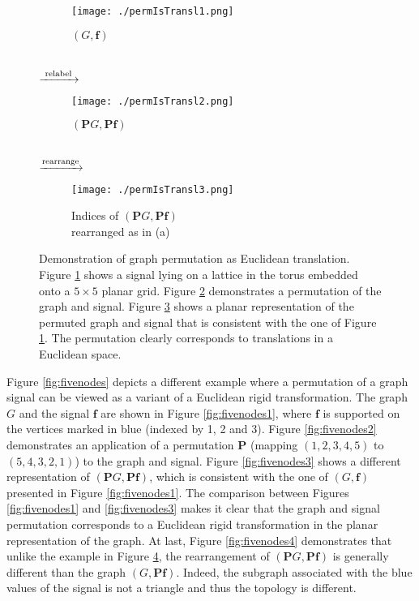 \documentclass{article}
\def\BP{\boldsymbol{P}}
\def\Bf{\boldsymbol{f}}
\begin{document}
\begin{figure}[!ht]
\centering
\begin{subfigure}{.25\textwidth}
	\centering
    \texttt{[image: ./permIsTransl1.png]}
    \caption{$(G, \Bf)$ \\ ~ }
\label{fig:permIsTransl1}
\end{subfigure}
{\large$\xrightarrow{\textup{~relabel~}}$}\begin{subfigure}{.25\textwidth}
	\centering
    \texttt{[image: ./permIsTransl2.png]}
    \caption{$(\BP G, \BP \Bf)$ \\ ~ }
\label{fig:permIsTransl2}
\end{subfigure}
{\large$\xrightarrow{\textup{rearrange}}$}\begin{subfigure}{.25\textwidth}
	\centering
    \texttt{[image: ./permIsTransl3.png]}
    \caption{Indices of $(\BP G, \BP \Bf)$ \\ rearranged as in (a)}
\label{fig:permIsTransl3}
\end{subfigure}
\caption{Demonstration of graph permutation as Euclidean translation. Figure \ref{fig:permIsTransl1} shows a signal lying on a lattice in the torus embedded onto a $5 \times 5$ planar grid. Figure \ref{fig:permIsTransl2} demonstrates a permutation of the graph and signal. Figure \ref{fig:permIsTransl3} shows a planar representation of the permuted graph and signal that is consistent with the one of Figure \ref{fig:permIsTransl1}. The permutation clearly corresponds to translations in a Euclidean space.}
\label{fig:permIsTransl}
\end{figure}


Figure \ref{fig:fivenodes} depicts a different example where a permutation of a graph signal can be viewed {as a variant of a Euclidean rigid transformation.}
The graph $G$ and the signal $\Bf$ are shown in Figure \ref{fig:fivenodes1}, where $\Bf$ is supported on the vertices marked in blue (indexed by 1, 2 and 3). Figure \ref{fig:fivenodes2} demonstrates an application of a permutation $\BP$ (mapping $(1,2,3,4,5)$ to $(5,4,3,2,1)$) to the graph and signal. Figure \ref{fig:fivenodes3} shows a different representation of $(\BP G, \BP \Bf)$, which is consistent with the one of $(G, \Bf)$ presented in Figure \ref{fig:fivenodes1}. The comparison between Figures \ref{fig:fivenodes1} and \ref{fig:fivenodes3} makes it clear that the graph and signal permutation corresponds to a Euclidean {rigid transformation} in the planar representation of the graph.  At last, Figure \ref{fig:fivenodes4} demonstrates that unlike the example in Figure \ref{fig:permIsTransl}, the rearrangement of $(\BP G, \BP \Bf)$
is generally different than 
the graph $(G, \BP \Bf)$. {Indeed, the subgraph associated with the blue values of the signal is not a triangle and thus the topology is different. }
\end{document}
